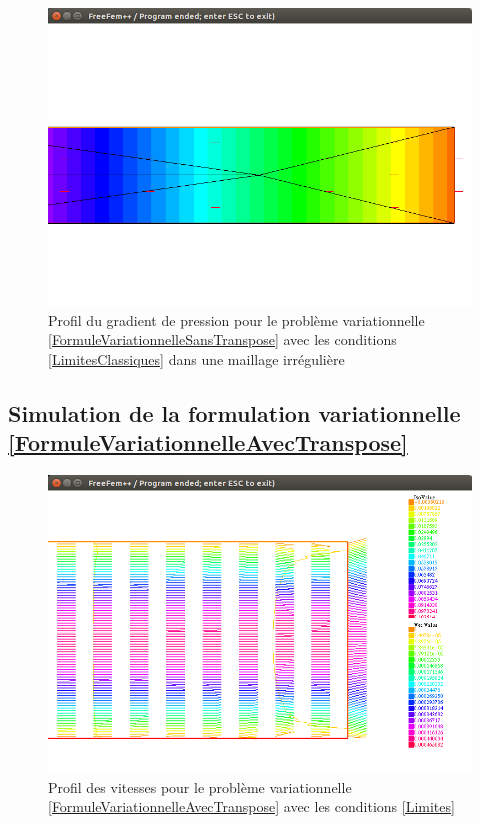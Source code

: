 \documentclass[11pt,a4paper]{article}
\numberwithin{equation}{subsection}
\numberwithin{figure}{subsection}
\begin{document}
\begin{figure}
\centering
\includegraphics[scale=0.4]{StokesConditionsClassiquesPressionIrregulier.png}
\caption{Profil du gradient de pression pour le problème variationnelle \ref{FormuleVariationnelleSansTranspose} avec les conditions \ref{LimitesClassiques} dans une maillage irrégulière}
\label{StokesConditionsClassiquesPressionIrregulier}
\end{figure}

\subsection{Simulation de la formulation variationnelle \ref{FormuleVariationnelleAvecTranspose}}

\begin{figure}[h]
\centering
\includegraphics[scale=0.4]{StokesConditionsTransposeVitesses.png}
\caption{Profil des vitesses pour le problème variationnelle \ref{FormuleVariationnelleAvecTranspose} avec les conditions \ref{Limites}}
\label{StokesLimitesTransposeVitesses}
\end{figure}
\end{document}
